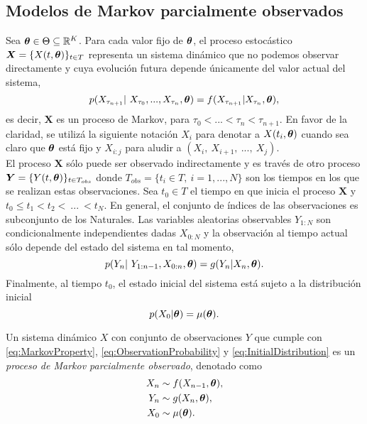 \subsection{Modelos de Markov parcialmente observados}


Sea $\boldsymbol{\theta}\in\Theta\subseteq \mathbb R^K$. Para cada valor fijo de $\boldsymbol{\theta}$, el proceso estocástico $\boldsymbol{X} = \{X(t,\boldsymbol{\theta})\}_{t\in T}$ 
representa un sistema dinámico que no podemos observar directamente y cuya evolución futura depende únicamente del valor actual del sistema, 
\begin{equation}\label{eq:MarkovProperty}
    p(X_{\tau_{n+1}}|\ X_{\tau_0},...,X_{\tau_n},\boldsymbol{\theta}) = f(X_{\tau_{n+1}}|X_{\tau_n}, \boldsymbol{\theta}),
\end{equation}
es decir, $\boldsymbol{X}$ es un proceso de Markov, para $\tau_0<...<\tau_n<\tau_{n+1}$. En favor de la claridad, se utilizá la siguiente notación $X_i$ para denotar a  $X(t_i, \boldsymbol{\theta})$ cuando sea claro que $\boldsymbol{\theta}$ está fijo 
y $X_{i:j}$ para aludir a $(X_i,\ X_{i+1},\ ...,\ X_j)$.\\

El proceso $\boldsymbol{X}$ sólo puede ser observado indirectamente y es través de otro proceso $\boldsymbol{Y} = \{Y(t, \boldsymbol{\theta})\}_{t\in T_{obs}}$ donde $T_{obs}=\{t_i\in 
T,\ i=1,...,N\}$ son los tiempos en los que se realizan estas observaciones. Sea $t_0\in T$ el tiempo en que inicia el proceso $\boldsymbol{X}$ y $t_0\leq t_1 < t_2 <\ ...\ <t_{N}$. En general, el conjunto de índices de las observaciones es subconjunto de los Naturales. Las variables aleatorias observables $Y_{1:N}$ son condicionalmente independientes dadas $X_{0:N}$ y la observación al tiempo actual sólo depende del estado del sistema en tal momento,
\begin{equation}\label{eq:ObservationProbability}
    p(Y_{n}|\ Y_{1:n-1}, X_{0:n}, \boldsymbol{\theta}) = g(Y_n| X_n, \boldsymbol{\theta}).
\end{equation}
Finalmente, al tiempo $t_0$, el estado inicial del sistema está sujeto a la distribución inicial
\begin{equation}\label{eq:InitialDistribution}
    p(X_{0}|\boldsymbol{\theta}) = \mu(\boldsymbol{\theta}).
\end{equation}

\begin{definition}
    Un sistema dinámico $X$ con conjunto de observaciones $Y$ que cumple con \ref{eq:MarkovProperty}, 
    \ref{eq:ObservationProbability} y \ref{eq:InitialDistribution} es un 
    \textit{proceso de Markov parcialmente observado}, denotado como 
    \begin{align}\label{eq:POMP}
       \begin{split}
        X_{n}&\sim f(X_{n-1},\boldsymbol{\theta}),\\
        Y_{n}&\sim g(X_n,\boldsymbol{\theta}),\\
        X_0&\sim\mu(\boldsymbol{\theta}).
    \end{split} 
    \end{align}
\end{definition}

